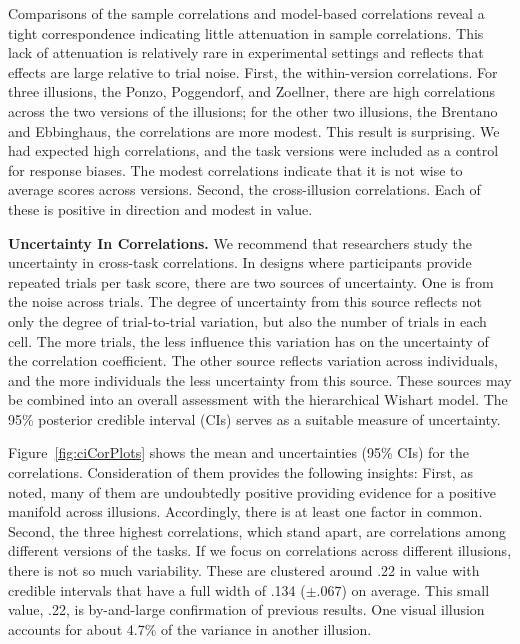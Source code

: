 Comparisons of the sample correlations and model-based correlations reveal a tight correspondence indicating little attenuation in sample correlations.  This lack of attenuation is relatively rare in experimental settings and reflects that effects are large relative to trial noise.  First, the within-version correlations.  For three illusions, the Ponzo, Poggendorf, and Zoellner, there are high correlations across the two versions of the illusions; for the other two illusions, the Brentano and Ebbinghaus, the correlations are more modest.  This result is surprising.   We had expected high correlations, and the task versions were included as a control for response biases.  The modest correlations indicate that it is not wise to average scores across versions.  Second, the cross-illusion correlations.  Each of these is positive in direction and modest in value.  

{\bf Uncertainty In Correlations.}  We recommend that researchers study the uncertainty in cross-task correlations.  In designs where participants provide repeated trials per task score, there are two sources of uncertainty.  One is from the noise across trials.  The degree of uncertainty from this source reflects not only the degree of trial-to-trial variation, but also the number of trials in each cell.  The more trials, the less influence this variation has on the uncertainty of the correlation coefficient.  The other source reflects variation across individuals, and the more individuals the less uncertainty from this source. These sources may be combined into an overall assessment with the hierarchical Wishart model.  The 95\% posterior credible interval (CIs) serves as a suitable measure of uncertainty.  

Figure~\ref{fig:ciCorPlots} shows the mean and uncertainties (95\% CIs) for the correlations.  Consideration of them provides the following insights:  First, as noted, many of them are undoubtedly positive providing evidence for a positive manifold across illusions.  Accordingly, there is at least one factor in common.  Second, the three highest correlations, which stand apart, are correlations among different versions of the tasks.  If we focus on correlations across different illusions, there is not so much variability.  These are clustered around .22 in value with credible intervals that have a full width of .134 ($\pm .067$) on average.  This small value, .22, is by-and-large confirmation of previous results.  One visual illusion accounts for about 4.7\% of the variance in another illusion. 

